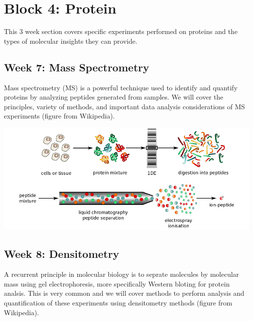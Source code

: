 \documentclass[]{book}
\begin{document}
\hypertarget{block-protein}{%
\chapter{Block 4: Protein}\label{block-protein}}

This 3 week section covers specific experiments performed on proteins and the types of molecular insights they can provide.

\hypertarget{week-7-mass-spectrometry}{%
\section{Week 7: Mass Spectrometry}\label{week-7-mass-spectrometry}}

Mass spectrometry (MS) is a powerful technique used to identify and quantify proteins by analyzing peptides generated from samples. We will cover the principles, variety of methods, and important data analysis considerations of MS experiments (figure from Wikipedia).

\begin{center}\includegraphics[width=13.57in]{classes/images/Mass_spectrometry} \end{center}

\hypertarget{week-8-densitometry}{%
\section{Week 8: Densitometry}\label{week-8-densitometry}}

A recurrent principle in molecular biology is to seprate molecules by molecular mass using gel electrophoresis, more specifically Western bloting for protein analsis. This is very common and we will cover methods to perform analysis and quantification of these experiments using densitometry methods (figure from Wikipedia).
\end{document}
